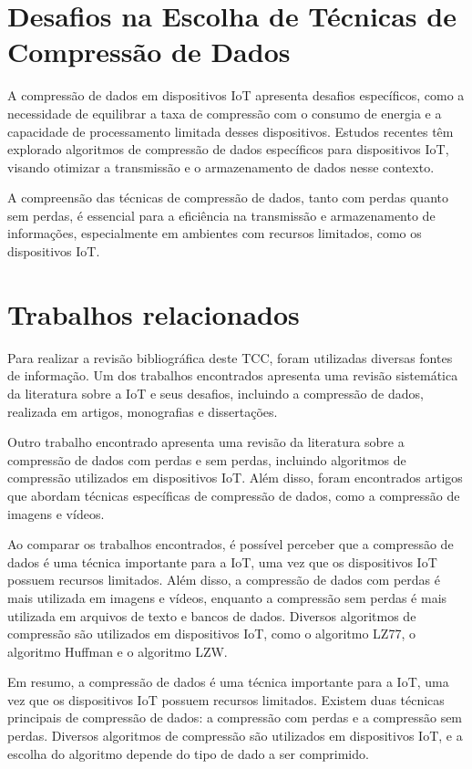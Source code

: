 \section{Desafios na Escolha de Técnicas de Compressão de Dados}
\label{sec:DesafiosnaEscolhadeTécnicasdeCompressãodeDados}

A compressão de dados em dispositivos IoT apresenta desafios específicos, como a necessidade de equilibrar a taxa de compressão com o consumo de energia e a capacidade de processamento limitada desses dispositivos. Estudos recentes têm explorado algoritmos de compressão de dados específicos para dispositivos IoT, visando otimizar a transmissão e o armazenamento de dados nesse contexto\cite{ricardo}.

A compreensão das técnicas de compressão de dados, tanto com perdas quanto sem perdas, é essencial para a eficiência na transmissão e armazenamento de informações, especialmente em ambientes com recursos limitados, como os dispositivos IoT.

\section{Trabalhos relacionados}
\label{sec:TrabalhosRelacionados}

Para realizar a revisão bibliográfica deste TCC, foram utilizadas diversas fontes de informação. Um dos trabalhos encontrados apresenta uma revisão sistemática da literatura sobre a IoT e seus desafios, incluindo a compressão de dados, realizada em artigos, monografias e dissertações\cite{fachini}.

Outro trabalho encontrado apresenta uma revisão da literatura sobre a compressão de dados com perdas e sem perdas, incluindo algoritmos de compressão utilizados em dispositivos IoT\cite{silvarevisao}. Além disso, foram encontrados artigos que abordam técnicas específicas de compressão de dados, como a compressão de imagens e vídeos\cite{almeida}\cite{silvacompressaovideo}.

Ao comparar os trabalhos encontrados, é possível perceber que a compressão de dados é uma técnica importante para a IoT, uma vez que os dispositivos IoT possuem recursos limitados.
Além disso, a compressão de dados com perdas é mais utilizada em imagens e vídeos, enquanto a compressão sem perdas é mais utilizada em arquivos de texto e bancos de dados. Diversos algoritmos de compressão são utilizados em dispositivos IoT, como o algoritmo LZ77, o algoritmo Huffman e o algoritmo LZW.

Em resumo, a compressão de dados é uma técnica importante para a IoT, uma vez que os dispositivos IoT possuem recursos limitados. Existem duas técnicas principais de compressão de dados: a compressão com perdas e a compressão sem perdas. Diversos algoritmos de compressão são utilizados em dispositivos IoT, e a escolha do algoritmo depende do tipo de dado a ser comprimido.

